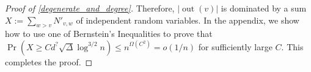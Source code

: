 \documentclass{patmorin}
\newcommand{\defin}[1]{\emph{\color{brightmaroon}#1}}
\DeclareMathOperator{\outn}{out}
\DeclareMathOperator{\comp}{comp}
\begin{document}
\begin{proof}[Proof of \cref{degenerate_and_degree}]
  Therefore, $|\outn(v)|$ is dominated by a sum $X:=\sum_{w> v} N'_{v,w}$ of independent random variables.  In the appendix, we show how to use one of Bernstein's Inequalities to prove that $\Pr\left(X\ge Cd^?\sqrt{\Delta}\log^{3/2} n\right)\le n^{\Omega(C^2)} = o(1/n)$ for sufficiently large $C$.  This completes the proof.

\end{proof}
\end{document}
